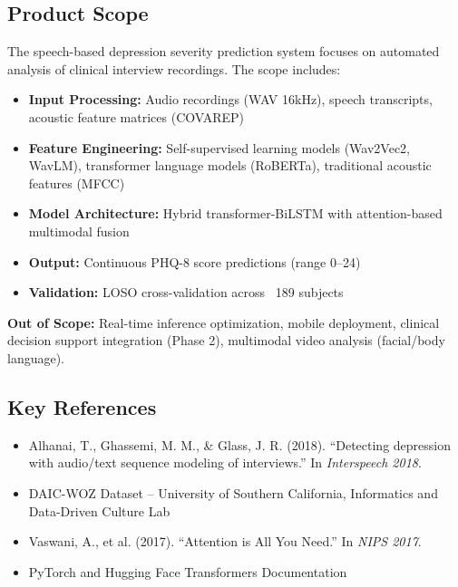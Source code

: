 \documentclass[12pt]{article}
\begin{document}
	\subsection{Product Scope}

	The speech-based depression severity prediction system focuses on automated analysis of clinical interview recordings. The scope includes:

	\begin{itemize}
		\item \textbf{Input Processing:} Audio recordings (WAV 16kHz), speech transcripts, acoustic feature matrices (COVAREP)
		\item \textbf{Feature Engineering:} Self-supervised learning models (Wav2Vec2, WavLM), transformer language models (RoBERTa), traditional acoustic features (MFCC)
		\item \textbf{Model Architecture:} Hybrid transformer-BiLSTM with attention-based multimodal fusion
		\item \textbf{Output:} Continuous PHQ-8 score predictions (range 0--24)
		\item \textbf{Validation:} LOSO cross-validation across ~189 subjects
	\end{itemize}

	\textbf{Out of Scope:} Real-time inference optimization, mobile deployment, clinical decision support integration (Phase 2), multimodal video analysis (facial/body language).

	\subsection{Key References}

	\begin{itemize}
		\item Alhanai, T., Ghassemi, M. M., \& Glass, J. R. (2018). ``Detecting depression with audio/text sequence modeling of interviews.'' In \textit{Interspeech 2018}.
		\item DAIC-WOZ Dataset – University of Southern California, Informatics and Data-Driven Culture Lab
		\item Vaswani, A., et al. (2017). ``Attention is All You Need.'' In \textit{NIPS 2017}.
		\item PyTorch and Hugging Face Transformers Documentation
	\end{itemize}

\end{document}
